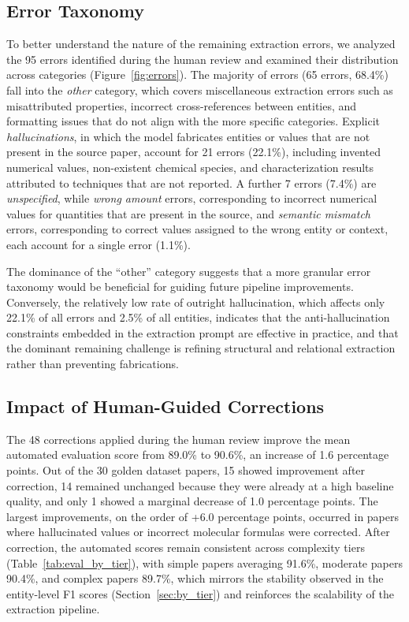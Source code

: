 \documentclass[12pt,a4paper]{article}
\begin{document}
\subsection{Error Taxonomy}
\label{sec:errors}

To better understand the nature of the remaining extraction errors, we analyzed the 95 errors identified during the human review and examined their distribution across categories (Figure~\ref{fig:errors}). The majority of errors (65 errors, 68.4\%) fall into the \textit{other} category, which covers miscellaneous extraction errors such as misattributed properties, incorrect cross-references between entities, and formatting issues that do not align with the more specific categories. Explicit \textit{hallucinations}, in which the model fabricates entities or values that are not present in the source paper, account for 21 errors (22.1\%), including invented numerical values, non-existent chemical species, and characterization results attributed to techniques that are not reported. A further 7 errors (7.4\%) are \textit{unspecified}, while \textit{wrong amount} errors, corresponding to incorrect numerical values for quantities that are present in the source, and \textit{semantic mismatch} errors, corresponding to correct values assigned to the wrong entity or context, each account for a single error (1.1\%).

The dominance of the ``other'' category suggests that a more granular error taxonomy would be beneficial for guiding future pipeline improvements. Conversely, the relatively low rate of outright hallucination, which affects only 22.1\% of all errors and 2.5\% of all entities, indicates that the anti-hallucination constraints embedded in the extraction prompt are effective in practice, and that the dominant remaining challenge is refining structural and relational extraction rather than preventing fabrications.

\subsection{Impact of Human-Guided Corrections}
\label{sec:corrections_impact}

The 48 corrections applied during the human review improve the mean automated evaluation score from 89.0\% to 90.6\%, an increase of 1.6 percentage points. Out of the 30 golden dataset papers, 15 showed improvement after correction, 14 remained unchanged because they were already at a high baseline quality, and only 1 showed a marginal decrease of 1.0 percentage points. The largest improvements, on the order of +6.0 percentage points, occurred in papers where hallucinated values or incorrect molecular formulas were corrected. After correction, the automated scores remain consistent across complexity tiers (Table~\ref{tab:eval_by_tier}), with simple papers averaging 91.6\%, moderate papers 90.4\%, and complex papers 89.7\%, which mirrors the stability observed in the entity-level F1 scores (Section~\ref{sec:by_tier}) and reinforces the scalability of the extraction pipeline.
\end{document}
